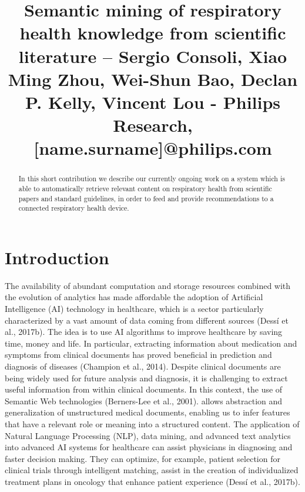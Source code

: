 \documentclass[runningheads,a4paper]{llncs}
\begin{document}
\mainmatter

\title{Semantic mining of respiratory health knowledge from scientific literature -- Sergio Consoli, Xiao Ming Zhou, Wei-Shun Bao, Declan P. Kelly, Vincent Lou - Philips Research, [name.surname]@philips.com}
\author{}

\institute{\\
\email{}}
\maketitle

\begin{abstract}
In this short contribution we describe our currently ongoing work on a system which is able to automatically retrieve relevant content on respiratory health from scientific papers and standard guidelines, in order to feed and provide recommendations to a connected respiratory health device.

\end{abstract}


\section{Introduction}

The availability of abundant computation and storage resources combined with the evolution of analytics has made affordable the adoption of Artificial Intelligence (AI) technology in healthcare, which is a sector particularly characterized by a vast amount of data coming from different sources (Dess\'i et al., 2017b). The idea is to use AI algorithms to improve healthcare by saving time, money and life. In particular, extracting information about medication and symptoms from clinical documents has proved beneficial in prediction and diagnosis of diseases (Champion et al., 2014). Despite clinical documents are being widely used for future analysis and diagnosis, it is challenging to extract useful information from within clinical documents. In this context, the use of Semantic Web technologies (Berners-Lee et al., 2001). allows abstraction and generalization of unstructured medical documents, enabling us to infer features that have a relevant role or meaning into a structured content. The application of Natural Language Processing (NLP), data mining, and advanced text analytics into advanced AI systems for healthcare can assist physicians in diagnosing and faster decision making. They can optimize, for example, patient selection for clinical trials through intelligent matching, assist in the creation of individualized treatment plans in oncology that enhance patient experience (Dess\'i et al., 2017b).
\end{document}
